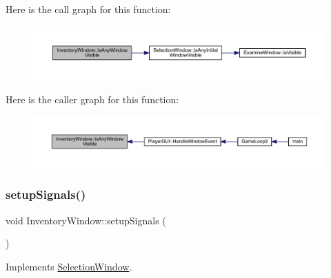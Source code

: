 Here is the call graph for this function\+:
\nopagebreak
\begin{figure}[H]
\begin{center}
\leavevmode
\includegraphics[width=350pt]{d1/dee/class_inventory_window_a6fd4220caaec67979e93f5b8b52365a8_cgraph}
\end{center}
\end{figure}
Here is the caller graph for this function\+:
\nopagebreak
\begin{figure}[H]
\begin{center}
\leavevmode
\includegraphics[width=350pt]{d1/dee/class_inventory_window_a6fd4220caaec67979e93f5b8b52365a8_icgraph}
\end{center}
\end{figure}
\mbox{\label{class_inventory_window_ada117b35239727b734887c1d56dcf6f0}} 
\subsubsection{\texorpdfstring{setup\+Signals()}{setupSignals()}}
{\footnotesize\ttfamily void Inventory\+Window\+::setup\+Signals (\begin{DoxyParamCaption}{ }\end{DoxyParamCaption})\hspace{0.3cm}{\ttfamily [virtual]}}



Implements \mbox{\hyperlink{class_selection_window_a912063c60bb6c7899422b5d470bcf64e}{Selection\+Window}}.

